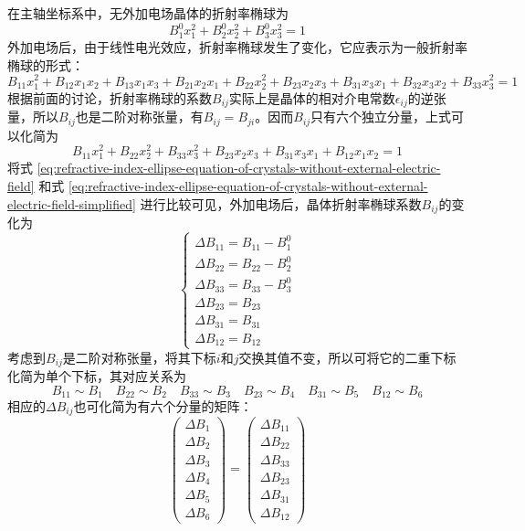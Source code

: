 \documentclass[cn,10pt,chinesefont=founder,math=mtpro2,cite=super,toc=onecol,twoside]{elegantbook}
\begin{document}
在主轴坐标系中，无外加电场晶体的折射率椭球为
\begin{equation}
B^0_1x^2_1+B^0_2x^2_2+B^0_3x^2_3=1
\label{eq:refractive-index-ellipse-equation-of-crystals-without-external-electric-field}
\end{equation}
外加电场后，由于线性电光效应，折射率椭球发生了变化，它应表示为一般折射率椭球的形式：
\begin{equation}
B_{11}x^2_1+B_{12}x_1x_2+B_{13}x_1x_3+B_{21}x_2x_1+B_{22}x^2_2+B_{23}x_2x_3+B_{31}x_3x_1+B_{32}x_3x_2+B_{33}x^2_3=1
\end{equation}
根据前面的讨论，折射率椭球的系数$B_{ij}$实际上是晶体的相对介电常数$\epsilon_{ij}$的逆张量，所以$B_{ij}$也是二阶对称张量，有$B_{ij}=B_{ji}$。因而$B_{ij}$只有六个独立分量，上式可以化简为
\begin{equation}
B_{11}x^2_1+B_{22}x^2_2+B_{33}x^2_3+B_{23}x_2x_3+B_{31}x_3x_1+B_{12}x_1x_2=1
\label{eq:refractive-index-ellipse-equation-of-crystals-without-external-electric-field-simplified}
\end{equation}
将式 \eqref{eq:refractive-index-ellipse-equation-of-crystals-without-external-electric-field} 和式 \eqref{eq:refractive-index-ellipse-equation-of-crystals-without-external-electric-field-simplified} 进行比较可见，外加电场后，晶体折射率椭球系数$B_{ij}$的变化为
\begin{equation}
\begin{cases}
\Delta B_{11}=B_{11}-B^0_1\\
\Delta B_{22}=B_{22}-B^0_2\\
\Delta B_{33}=B_{33}-B^0_3\\
\Delta B_{23}=B_{23}\\
\Delta B_{31}=B_{31}\\
\Delta B_{12}=B_{12}
\end{cases}
\end{equation}
考虑到$B_{ij}$是二阶对称张量，将其下标$i$和$j$交换其值不变，所以可将它的二重下标化简为单个下标，其对应关系为
\begin{equation}
B_{11}\sim B_1\quad B_{22}\sim B_2\quad B_{33}\sim B_3\quad B_{23}\sim B_4\quad B_{31}\sim B_5\quad B_{12}\sim B_6
\end{equation}
相应的$\Delta B_{ij}$也可化简为有六个分量的矩阵：
\begin{equation}
\begin{pmatrix}
\Delta B_1\\
\Delta B_2\\
\Delta B_3\\
\Delta B_4\\
\Delta B_5\\
\Delta B_6
\end{pmatrix}=
\begin{pmatrix}
\Delta B_{11}\\
\Delta B_{22}\\
\Delta B_{33}\\
\Delta B_{23}\\
\Delta B_{31}\\
\Delta B_{12}
\end{pmatrix}
\end{equation}
\end{document}
